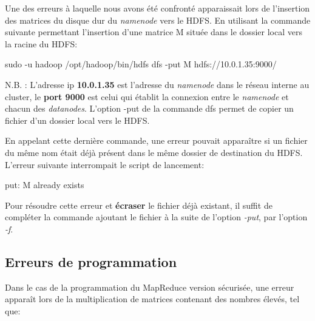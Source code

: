 Une des erreurs à laquelle nous avons été confronté apparaissait lors de l'insertion des matrices du disque dur du \textit{namenode} vers le HDFS.
En utilisant la commande suivante permettant l'insertion d'une matrice M située dans le dossier local vers la racine du HDFS:\par
\vspace{0.5\baselineskip}

\begin{ttfamily}
sudo -u hadoop /opt/hadoop/bin/hdfs dfs -put M hdfs://10.0.1.35:9000/
\end{ttfamily}\par
\vspace{0.5\baselineskip}

N.B. : L'adresse ip \textbf{10.0.1.35} est l'adresse du \textit{namenode} dans le réseau interne au cluster, le \textbf{port 9000} est celui qui établit la connexion entre le \textit{namenode} et chacun des \textit{datanodes}.
L'option -put de la commande dfs permet de copier un fichier d'un dossier local vers le HDFS.\par
\vspace{1\baselineskip}
En appelant cette dernière commande, une erreur pouvait apparaître si un fichier du même nom était déjà présent dans le même dossier de destination du HDFS. L'erreur suivante interrompait le script de lancement:\par
\vspace{0.5\baselineskip}

\begin{ttfamily}
put: M already exists
\end{ttfamily}\par
\vspace{0.5\baselineskip}

Pour résoudre cette erreur et \textbf{écraser} le fichier déjà existant, il suffit de compléter la commande ajoutant le fichier à la suite de l'option \textit{-put}, par l'option \textit{-f}.
\vspace{1.5\baselineskip}

\subsection{Erreurs de programmation}

Dans le cas de la programmation du MapReduce version sécurisée, une erreur apparaît lors de la multiplication de matrices contenant des nombres élevés, tel que:\par
\vspace{0.5\baselineskip}

